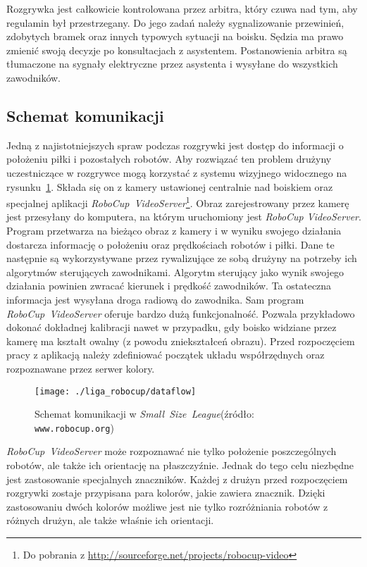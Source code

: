 	Rozgrywka jest całkowicie kontrolowana przez arbitra, który czuwa nad tym, aby  regulamin był przestrzegany. Do
	jego zadań należy sygnalizowanie przewinień, zdobytych bramek oraz innych typowych sytuacji na boisku.
	Sędzia ma prawo zmienić swoją decyzje po konsultacjach z asystentem. Postanowienia arbitra są tłumaczone na
	sygnały elektryczne przez asystenta i wysyłane do wszystkich zawodników.

	\subsection{Schemat komunikacji}
	Jedną z najistotniejszych spraw podczas rozgrywki jest dostęp do informacji o położeniu piłki
	i pozostałych robotów. Aby rozwiązać ten problem drużyny uczestniczące w rozgrywce mogą korzystać z systemu wizyjnego widocznego na rysunku~\ref{fig:comunication}. 
	Składa się on z kamery ustawionej centralnie nad boiskiem oraz specjalnej aplikacji \mbox{\emph{RoboCup VideoServer}}\footnote{ Do pobrania z \url{http://sourceforge.net/projects/robocup-video}}. 
	Obraz zarejestrowany przez kamerę jest przesyłany do komputera, na którym uruchomiony jest \emph{RoboCup VideoServer}. Program przetwarza na bieżąco obraz z kamery i w wyniku swojego działania dostarcza informację 
	o położeniu oraz prędkościach robotów i piłki. Dane te następnie są wykorzystywane przez rywalizujące ze sobą drużyny na potrzeby ich algorytmów sterujących zawodnikami.
 	Algorytm sterujący jako wynik swojego działania powinien zwracać kierunek i prędkość zawodników. Ta ostateczna informacja jest wysyłana droga radiową do zawodnika.
	Sam program \mbox{\emph{RoboCup VideoServer}} oferuje bardzo dużą funkcjonalność. Pozwala przykładowo dokonać dokładnej
	kalibracji nawet w przypadku, gdy boisko widziane przez kamerę ma kształt owalny (z powodu zniekształceń obrazu). Przed rozpoczęciem pracy z aplikacją
	należy zdefiniować początek układu współrzędnych oraz rozpoznawane przez serwer kolory.
	\begin{figure}[H]
	\centering
	\texttt{[image: ./liga\_robocup/dataflow]}
	\caption{Schemat komunikacji w  \mbox{\emph{Small Size League}}\newline(źródło: \texttt{www.robocup.org}) }
	\label{fig:comunication}
	\end{figure} 	
	\mbox{\emph{RoboCup VideoServer}} może rozpoznawać nie tylko położenie poszczególnych robotów, ale także ich orientację na
	płaszczyźnie. Jednak do tego celu niezbędne jest zastosowanie specjalnych znaczników. Każdej z drużyn przed rozpoczęciem rozgrywki zostaje przypisana para kolorów, jakie zawiera znacznik. Dzięki zastosowaniu dwóch kolorów możliwe jest nie tylko rozróżniania robotów z różnych drużyn, ale także właśnie ich orientacji.


